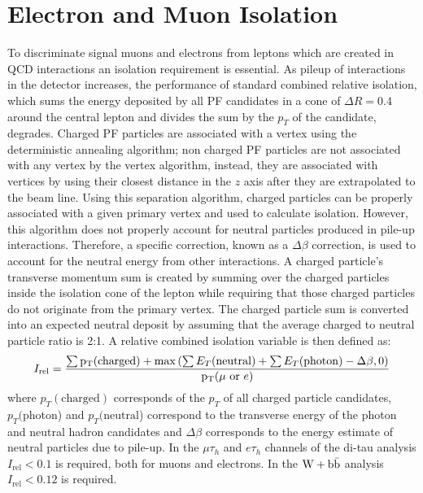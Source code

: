 \section{Electron and Muon Isolation}
To discriminate signal muons and electrons from leptons
which are created in QCD interactions an isolation requirement is essential. 
As pileup of interactions in the detector increases, the performance of standard
combined relative isolation, which sums the 
energy deposited by all PF candidates in a cone of $\Delta R = 0.4$ around the central
lepton and divides the sum by the $p_{T}$ of 
the candidate, degrades. Charged PF particles are associated with 
a vertex using the deterministic annealing algorithm; non charged PF particles
are not associated with any vertex by the vertex algorithm, instead,
they are associated with vertices by using their closest distance in the
$z$ axis after they are extrapolated to the beam line. Using this separation algorithm,
charged particles can be properly associated with a given primary vertex
and used to calculate isolation. However, this algorithm does not
properly account for neutral particles produced in pile-up interactions. 
Therefore, a specific correction, known as a $\Delta \beta$ correction, is
used to account for the neutral energy from other interactions.
A charged particle's transverse momentum sum is created by summing over
the charged particles inside the isolation cone of the lepton while %
requiring that those charged particles do not originate from the primary vertex.
The charged particle sum is converted into an expected neutral deposit by
assuming that the average charged to neutral particle ratio is 2:1.
A relative combined isolation variable is then defined as:
\begin{equation}
I_{\rm rel} = \frac{\sum{\mathrm{p_{T}}(\mathrm{charged})} + \max\left(\sum{E_{T}(\mathrm{neutral})} + \sum{E_{T}(\mathrm{photon})} - \Delta\beta, 0\right)}{\mathrm{p_{T}}(\mu \, \, \mathrm{or} \,\, e)}
\label{eq:relIso}
\end{equation}
where $p_{T}(\mathrm{charged})$ corresponds of the $p_{T}$ 
of all charged particle candidates, $p_{T}(\mathrm{photon}$)
and $p_{T}(\mathrm{neutral}$) correspond to the transverse 
energy of the photon and neutral hadron candidates
and $\Delta\beta$ corresponds to the energy estimate of neutral particles due to pile-up.
In the $\mu\tau_{h}$ and $e\tau_{h}$ channels of the di-tau 
analysis $I_{\mathrm{rel}}<0.1$ is required, both for muons and electrons. In the $\mathrm{W+\mathrm{b\bar{b}}}$
analysis $I_{\mathrm{rel}}<0.12$ is required. 

